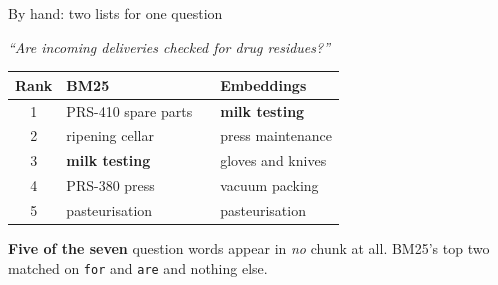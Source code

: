 \documentclass[aspectratio=169]{beamer}
\begin{document}
\begin{frame}{By hand: two lists for one question}
  \vspace{0.4em}
  \begin{center}
  \begin{tcolorbox}[colback=lightbg, colframe=gray, boxrule=0.5pt, arc=2pt, width=0.86\textwidth]
    \small \textit{``Are incoming deliveries checked for drug residues?''}
  \end{tcolorbox}
  \end{center}

  \vspace{0.5em}
  \begin{center}
  \small
  \begin{tabular}{clcl}
    \toprule
    \textbf{Rank} & \textbf{BM25} & & \textbf{Embeddings} \\
    \midrule
    1 & PRS-410 spare parts & & \textbf{\color{paramgreen}milk testing} \\
    2 & ripening cellar     & & press maintenance \\
    3 & \textbf{\color{paramgreen}milk testing} & & gloves and knives \\
    4 & PRS-380 press       & & vacuum packing \\
    5 & pasteurisation      & & pasteurisation \\
    \bottomrule
  \end{tabular}
  \end{center}

  \vspace{0.6em}
  {\small \textbf{Five of the seven} question words appear in \emph{no} chunk at all. BM25's
  top two matched on \texttt{for} and \texttt{are} and nothing else.}
\end{frame}
\end{document}
